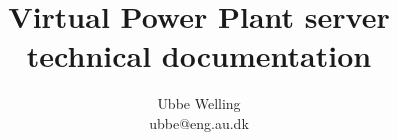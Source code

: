 \documentclass{report}
\begin{document}
\title{Virtual Power Plant server \\ technical documentation}
\author{Ubbe Welling\\ubbe@eng.au.dk}

\maketitle

\setcounter{tocdepth}{1}
\tableofcontents










\end{document}
